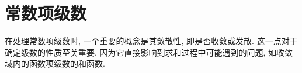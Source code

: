 \section{常数项级数}

在处理常数项级数时, 一个重要的概念是其敛散性, 即是否收敛或发散. 这一点对于确定级数的性质至关重要, 因为它直接影响到求和过程中可能遇到的问题, 如收敛域内的函数项级数的和函数. 

% 
